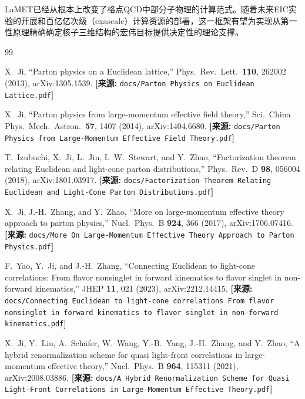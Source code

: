 \documentclass[12pt,a4paper]{ctexart}
\theoremstyle{definition}
\begin{document}
LaMET已经从根本上改变了格点QCD中部分子物理的计算范式。随着未来EIC实验的开展和百亿亿次级（exascale）计算资源的部署，这一框架有望为实现从第一性原理精确确定核子三维结构的宏伟目标提供决定性的理论支撑。

\begin{thebibliography}{99}


X.~Ji,
``Parton physics on a Euclidean lattice,''
Phys.\ Rev.\ Lett.\ \textbf{110}, 262002 (2013), arXiv:1305.1539.
\quad\textbf{[来源:} \texttt{docs/Parton Physics on Euclidean Lattice.pdf}\textbf{]}

X.~Ji,
``Parton physics from large-momentum effective field theory,''
Sci.\ China Phys.\ Mech.\ Astron.\ \textbf{57}, 1407 (2014), arXiv:1404.6680.
\quad\textbf{[来源:} \texttt{docs/Parton Physics from Large-Momentum Effective Field Theory.pdf}\textbf{]}

T.~Izubuchi, X.~Ji, L.~Jin, I.~W.~Stewart, and Y.~Zhao,
``Factorization theorem relating Euclidean and light-cone parton distributions,''
Phys.\ Rev.\ D \textbf{98}, 056004 (2018), arXiv:1801.03917.
\quad\textbf{[来源:} \texttt{docs/Factorization Theorem Relating Euclidean and Light-Cone Parton Distributions.pdf}\textbf{]}

X.~Ji, J.-H.~Zhang, and Y.~Zhao,
``More on large-momentum effective theory approach to parton physics,''
Nucl.\ Phys.\ B \textbf{924}, 366 (2017), arXiv:1706.07416.
\quad\textbf{[来源:} \texttt{docs/More On Large-Momentum Effective Theory Approach to Parton Physics.pdf}\textbf{]}

F.~Yao, Y.~Ji, and J.-H.~Zhang,
``Connecting Euclidean to light-cone correlations: From flavor nonsinglet in forward kinematics to flavor singlet in non-forward kinematics,''
JHEP \textbf{11}, 021 (2023), arXiv:2212.14415.
\quad\textbf{[来源:} \texttt{docs/Connecting Euclidean to light-cone correlations From flavor nonsinglet in forward kinematics to flavor singlet in non-forward kinematics.pdf}\textbf{]}


X.~Ji, Y.~Liu, A.~Sch\"afer, W.~Wang, Y.-B.~Yang, J.-H.~Zhang, and Y.~Zhao,
``A hybrid renormalization scheme for quasi light-front correlations in large-momentum effective theory,''
Nucl.\ Phys.\ B \textbf{964}, 115311 (2021), arXiv:2008.03886.
\quad\textbf{[来源:} \texttt{docs/A Hybrid Renormalization Scheme for Quasi Light-Front Correlations in Large-Momentum Effective Theory.pdf}\textbf{]}


\end{thebibliography}
\end{document}

